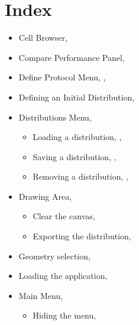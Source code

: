 \chapter{Index}
\begin{itemize}
  \item Cell Browser, \pageref{sec:cellBrows}
  \item Compare Performance Panel, \pageref{sec:compareperf}
  \item Define Protocol Menu, \pageref{sec:defprot}, \pageref{sec:defineMixProt}
  \item Defining an Initial Distribution, \pageref{sec:defineDist}
  \item Distributions Menu, \pageref{sec:distmenu}
  \begin{itemize}
    \item Loading a distribution, \pageref{sec:distmenu}, \pageref{sec:loadDist}
    \item Saving a distribution, \pageref{sec:distmenu}, \pageref{sec:savdist}
    \item Removing a distribution, \pageref{sec:distmenu}, \pageref{sec:remdist}
  \end{itemize}

  \item Drawing Area, \pageref{sec:drawingarea}
  \begin{itemize}
    \item Clear the canvas, \pageref{sec:defineDist}
    \item Exporting the distribution, \pageref{sec:exportDist}
  \end{itemize}

  \item Geometry selection, \pageref{sec:ChooseGeomAndMixer}
  \item Loading the application, \pageref{sec:ChooseGeomAndMixer} 
  \item Main Menu, \pageref{sec:mainmenu}
  \begin{itemize}
    \item Hiding the menu, \pageref{sec:defineDist}
  \end{itemize}


\end{itemize}
